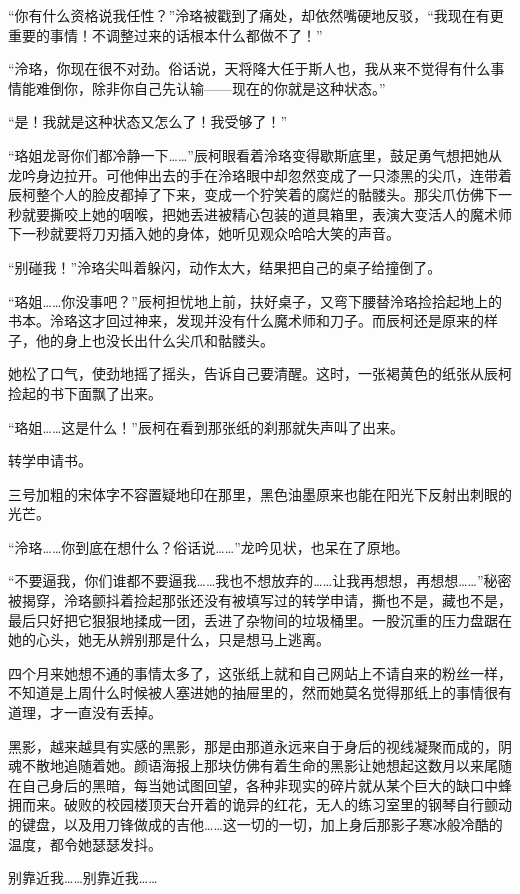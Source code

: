 \documentclass[UTF8, scheme = chinese, openany]{ctexbook}
\begin{document}
“你有什么资格说我任性？”泠珞被戳到了痛处，却依然嘴硬地反驳，“我现在有更重要的事情！不调整过来的话根本什么都做不了！”

“泠珞，你现在很不对劲。俗话说，天将降大任于斯人也，我从来不觉得有什么事情能难倒你，除非你自己先认输——现在的你就是这种状态。”

“是！我就是这种状态又怎么了！我受够了！”

“珞姐龙哥你们都冷静一下……”辰柯眼看着泠珞变得歇斯底里，鼓足勇气想把她从龙吟身边拉开。可他伸出去的手在泠珞眼中却忽然变成了一只漆黑的尖爪，连带着辰柯整个人的脸皮都掉了下来，变成一个狞笑着的腐烂的骷髅头。那尖爪仿佛下一秒就要撕咬上她的咽喉，把她丢进被精心包装的道具箱里，表演大变活人的魔术师下一秒就要将刀刃插入她的身体，她听见观众哈哈大笑的声音。

“别碰我！”泠珞尖叫着躲闪，动作太大，结果把自己的桌子给撞倒了。

“珞姐……你没事吧？”辰柯担忧地上前，扶好桌子，又弯下腰替泠珞捡拾起地上的书本。泠珞这才回过神来，发现并没有什么魔术师和刀子。而辰柯还是原来的样子，他的身上也没长出什么尖爪和骷髅头。

她松了口气，使劲地摇了摇头，告诉自己要清醒。这时，一张褐黄色的纸张从辰柯捡起的书下面飘了出来。

“珞姐……这是什么！”辰柯在看到那张纸的刹那就失声叫了出来。

转学申请书。

三号加粗的宋体字不容置疑地印在那里，黑色油墨原来也能在阳光下反射出刺眼的光芒。

“泠珞……你到底在想什么？俗话说……”龙吟见状，也呆在了原地。

“不要逼我，你们谁都不要逼我……我也不想放弃的……让我再想想，再想想……”秘密被揭穿，泠珞颤抖着捡起那张还没有被填写过的转学申请，撕也不是，藏也不是，最后只好把它狠狠地揉成一团，丢进了杂物间的垃圾桶里。一股沉重的压力盘踞在她的心头，她无从辨别那是什么，只是想马上逃离。

四个月来她想不通的事情太多了，这张纸上就和自己网站上不请自来的粉丝一样，不知道是上周什么时候被人塞进她的抽屉里的，然而她莫名觉得那纸上的事情很有道理，才一直没有丢掉。

黑影，越来越具有实感的黑影，那是由那道永远来自于身后的视线凝聚而成的，阴魂不散地追随着她。颜语海报上那块仿佛有着生命的黑影让她想起这数月以来尾随在自己身后的黑暗，每当她试图回望，各种非现实的碎片就从某个巨大的缺口中蜂拥而来。破败的校园楼顶天台开着的诡异的红花，无人的练习室里的钢琴自行颤动的键盘，以及用刀锋做成的吉他……这一切的一切，加上身后那影子寒冰般冷酷的温度，都令她瑟瑟发抖。

别靠近我……别靠近我……
\end{document}
